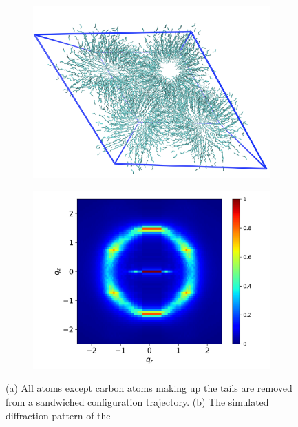\documentclass{article}
\begin{document}
  \begin{figure}
	\centering
	\begin{subfigure}{0.45\linewidth}
		\centering
		\includegraphics[width=\textwidth]{tails_topview.png}  %
		\caption{}\label{fig:topdown_tails_only}
	\end{subfigure}
	\begin{subfigure}{0.45\linewidth}
		\centering
		\includegraphics[width=\textwidth]{tails_rzplot.png}
		\caption{}\label{fig:tails_rzplot}
	\end{subfigure}
	\caption{(a) All atoms except carbon atoms making up the tails are removed from a 
	sandwiched configuration trajectory. (b) The simulated diffraction pattern of the
}
\end{figure}
\end{document}

